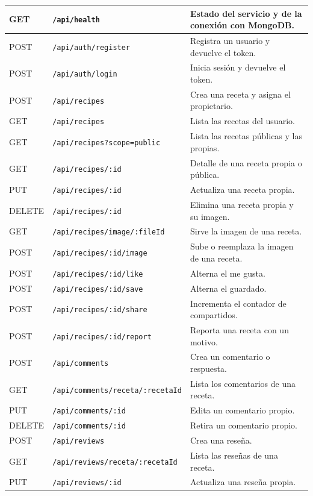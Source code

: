 \documentclass[doc,12pt,a4paper]{apa7}
\begin{document}
\begin{longtable}{|P{1.8cm}|P{6.4cm}|L{6.4cm}|}
GET & \texttt{/api/health} & Estado del servicio y de la conexión con MongoDB. \\ \hline
POST & \texttt{/api/auth/register} & Registra un usuario y devuelve el token. \\ \hline
POST & \texttt{/api/auth/login} & Inicia sesión y devuelve el token. \\ \hline
POST & \texttt{/api/recipes} & Crea una receta y asigna el propietario. \\ \hline
GET & \texttt{/api/recipes} & Lista las recetas del usuario. \\ \hline
GET & \texttt{/api/recipes?scope=public} & Lista las recetas públicas y las propias. \\ \hline
GET & \texttt{/api/recipes/:id} & Detalle de una receta propia o pública. \\ \hline
PUT & \texttt{/api/recipes/:id} & Actualiza una receta propia. \\ \hline
DELETE & \texttt{/api/recipes/:id} & Elimina una receta propia y su imagen. \\ \hline
GET & \texttt{/api/recipes/image/:fileId} & Sirve la imagen de una receta. \\ \hline
POST & \texttt{/api/recipes/:id/image} & Sube o reemplaza la imagen de una receta. \\ \hline
POST & \texttt{/api/recipes/:id/like} & Alterna el me gusta. \\ \hline
POST & \texttt{/api/recipes/:id/save} & Alterna el guardado. \\ \hline
POST & \texttt{/api/recipes/:id/share} & Incrementa el contador de compartidos. \\ \hline
POST & \texttt{/api/recipes/:id/report} & Reporta una receta con un motivo. \\ \hline
POST & \texttt{/api/comments} & Crea un comentario o respuesta. \\ \hline
GET & \texttt{/api/comments/receta/:recetaId} & Lista los comentarios de una receta. \\ \hline
PUT & \texttt{/api/comments/:id} & Edita un comentario propio. \\ \hline
DELETE & \texttt{/api/comments/:id} & Retira un comentario propio. \\ \hline
POST & \texttt{/api/reviews} & Crea una reseña. \\ \hline
GET & \texttt{/api/reviews/receta/:recetaId} & Lista las reseñas de una receta. \\ \hline
PUT & \texttt{/api/reviews/:id} & Actualiza una reseña propia. \\ \hline

\end{longtable}
\end{document}
